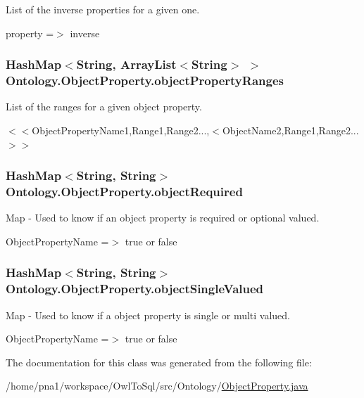 List of the inverse properties for a given one. 

property =$>$ inverse \hypertarget{class_ontology_1_1_object_property_a7e8b47c59b8d708d2ab5a02058a795f1}{
\subsubsection[{objectPropertyRanges}]{\setlength{\rightskip}{0pt plus 5cm}HashMap$<$String, ArrayList$<$String$>$ $>$ {\bf Ontology.ObjectProperty.objectPropertyRanges}}}
\label{class_ontology_1_1_object_property_a7e8b47c59b8d708d2ab5a02058a795f1}


List of the ranges for a given object property. 

$<$$<$ObjectPropertyName1,Range1,Range2...,$<$ObjectName2,Range1,Range2...$>$$>$ \hypertarget{class_ontology_1_1_object_property_a1bb591de60f79ef7fc2f194c93dcff92}{
\subsubsection[{objectRequired}]{\setlength{\rightskip}{0pt plus 5cm}HashMap$<$String, String$>$ {\bf Ontology.ObjectProperty.objectRequired}}}
\label{class_ontology_1_1_object_property_a1bb591de60f79ef7fc2f194c93dcff92}


Map -\/ Used to know if an object property is required or optional valued. 

ObjectPropertyName =$>$ true or false \hypertarget{class_ontology_1_1_object_property_ae17f30505dd7960fa544de3063ccdb10}{
\subsubsection[{objectSingleValued}]{\setlength{\rightskip}{0pt plus 5cm}HashMap$<$String, String$>$ {\bf Ontology.ObjectProperty.objectSingleValued}}}
\label{class_ontology_1_1_object_property_ae17f30505dd7960fa544de3063ccdb10}


Map -\/ Used to know if a object property is single or multi valued. 

ObjectPropertyName =$>$ true or false 

The documentation for this class was generated from the following file:\begin{DoxyCompactItemize}
\item 
/home/pna1/workspace/OwlToSql/src/Ontology/\hyperlink{_object_property_8java}{ObjectProperty.java}\end{DoxyCompactItemize}
